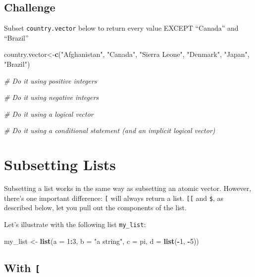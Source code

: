 \documentclass[]{book}
\newenvironment{Shaded}{\begin{snugshade}}{\end{snugshade}}
\newcommand{\KeywordTok}[1]{\textcolor[rgb]{0.13,0.29,0.53}{\textbf{#1}}}
\newcommand{\DataTypeTok}[1]{\textcolor[rgb]{0.13,0.29,0.53}{#1}}
\newcommand{\DecValTok}[1]{\textcolor[rgb]{0.00,0.00,0.81}{#1}}
\newcommand{\StringTok}[1]{\textcolor[rgb]{0.31,0.60,0.02}{#1}}
\newcommand{\CommentTok}[1]{\textcolor[rgb]{0.56,0.35,0.01}{\textit{#1}}}
\newcommand{\OperatorTok}[1]{\textcolor[rgb]{0.81,0.36,0.00}{\textbf{#1}}}
\newcommand{\NormalTok}[1]{#1}
\begin{document}
\subsection{Challenge}\label{challenge-1}

Subset \texttt{country.vector} below to return every value EXCEPT
``Canada'' and ``Brazil''

\begin{Shaded}
\begin{Highlighting}[]
\NormalTok{country.vector<-}\KeywordTok{c}\NormalTok{(}\StringTok{"Afghanistan"}\NormalTok{, }\StringTok{"Canada"}\NormalTok{, }\StringTok{"Sierra Leone"}\NormalTok{, }\StringTok{"Denmark"}\NormalTok{, }\StringTok{"Japan"}\NormalTok{, }\StringTok{"Brazil"}\NormalTok{)}

\CommentTok{# Do it using positive integers}

\CommentTok{# Do it using negative integers}

\CommentTok{# Do it using a logical vector}

\CommentTok{# Do it using a conditional statement (and an implicit logical vector)}
\end{Highlighting}
\end{Shaded}

\section{Subsetting Lists}\label{subsetting-lists}

Subsetting a list works in the same way as subsetting an atomic vector.
However, there's one important difference: \texttt{{[}} will always
return a list. \texttt{{[}{[}} and \texttt{\$}, as described below, let
you pull out the components of the list.

Let's illustrate with the following list \texttt{my\_list}:

\begin{Shaded}
\begin{Highlighting}[]
\NormalTok{my_list <-}\StringTok{ }\KeywordTok{list}\NormalTok{(}\DataTypeTok{a =} \DecValTok{1}\OperatorTok{:}\DecValTok{3}\NormalTok{, }\DataTypeTok{b =} \StringTok{"a string"}\NormalTok{, }\DataTypeTok{c =}\NormalTok{ pi, }\DataTypeTok{d =} \KeywordTok{list}\NormalTok{(}\OperatorTok{-}\DecValTok{1}\NormalTok{, }\OperatorTok{-}\DecValTok{5}\NormalTok{))}
\end{Highlighting}
\end{Shaded}

\subsection{\texorpdfstring{With \texttt{{[}}}{With {[}}}\label{with}
\end{document}
